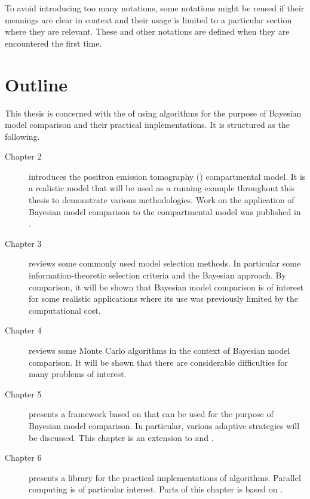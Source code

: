 To avoid introducing too many notations, some notations might be reused if their meanings are clear in  context and their usage is limited to a particular section where they are relevant. These and other notations are defined when they are encountered the first time.

\section{Outline}
\label{sec:Outline}

This thesis is concerned with the  of using \smc algorithms for the purpose of Bayesian model comparison and their practical implementations. It is structured as the following.
\begin{description}
  \item[Chapter 2] introduces the positron emission tomography (\pet) compartmental model. It is a realistic model that will be used as a running example throughout this thesis to demonstrate various methodologies. Work on the application of Bayesian model comparison to the \pet compartmental model was published in \cite{Zhou2013}.
  \item[Chapter 3] reviews some commonly used model selection methods. In particular some information-theoretic selection criteria and the Bayesian approach. By comparison, it will be shown that Bayesian model comparison is of interest for some realistic applications where its use was previously limited by the computational cost.
  \item[Chapter 4] reviews some Monte Carlo algorithms in the context of Bayesian model comparison. It will be shown that there are considerable difficulties for many problems of interest.
  \item[Chapter 5] presents a framework based on \smc that can be used for the purpose of Bayesian model comparison. In particular, various adaptive strategies will be discussed. This chapter is an extension to \cite{Zhou:2013vx} and \cite{Zhou:2012uz}.
  \item[Chapter 6] presents a \cpp library for the practical implementations of \smc algorithms. Parallel computing is of particular interest. Parts of this chapter is based on \cite{vsmcjss}.
\end{description}
